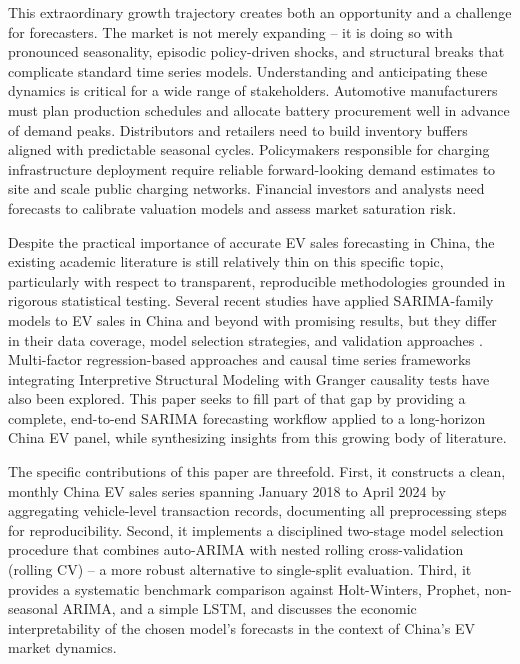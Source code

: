 \documentclass[12pt]{article}
\begin{document}
This extraordinary growth trajectory creates both an opportunity and a challenge for forecasters. The market is not merely expanding -- it is doing so with pronounced seasonality, episodic policy-driven shocks, and structural breaks that complicate standard time series models. Understanding and anticipating these dynamics is critical for a wide range of stakeholders. Automotive manufacturers must plan production schedules and allocate battery procurement well in advance of demand peaks. Distributors and retailers need to build inventory buffers aligned with predictable seasonal cycles. Policymakers responsible for charging infrastructure deployment require reliable forward-looking demand estimates to site and scale public charging networks. Financial investors and analysts need forecasts to calibrate valuation models and assess market saturation risk.

Despite the practical importance of accurate EV sales forecasting in China, the existing academic literature is still relatively thin on this specific topic, particularly with respect to transparent, reproducible methodologies grounded in rigorous statistical testing. Several recent studies have applied SARIMA-family models to EV sales in China and beyond with promising results, but they differ in their data coverage, model selection strategies, and validation approaches \citep{chen2025, cetin2024, liang2025, lu2024}. Multi-factor regression-based approaches \citep{yang2024} and causal time series frameworks integrating Interpretive Structural Modeling with Granger causality tests \citep{ge2024} have also been explored. This paper seeks to fill part of that gap by providing a complete, end-to-end SARIMA forecasting workflow applied to a long-horizon China EV panel, while synthesizing insights from this growing body of literature.

The specific contributions of this paper are threefold. First, it constructs a clean, monthly China EV sales series spanning January 2018 to April 2024 by aggregating vehicle-level transaction records, documenting all preprocessing steps for reproducibility. Second, it implements a disciplined two-stage model selection procedure that combines auto-ARIMA with nested rolling cross-validation (rolling CV) -- a more robust alternative to single-split evaluation. Third, it provides a systematic benchmark comparison against Holt-Winters, Prophet, non-seasonal ARIMA, and a simple LSTM, and discusses the economic interpretability of the chosen model's forecasts in the context of China's EV market dynamics.
\end{document}
